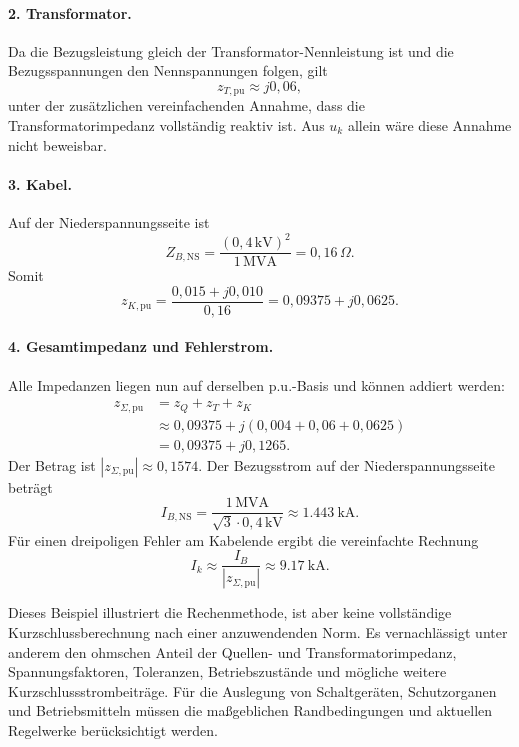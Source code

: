 \paragraph{2. Transformator.}
Da die Bezugsleistung gleich der Transformator-Nennleistung ist und die
Bezugsspannungen den Nennspannungen folgen, gilt
\[
 z_{T,\mathrm{pu}}\approx j0{,}06,
\]
unter der zusätzlichen vereinfachenden Annahme, dass die Transformatorimpedanz
vollständig reaktiv ist. Aus $u_k$ allein wäre diese Annahme nicht beweisbar.

\paragraph{3. Kabel.}
Auf der Niederspannungsseite ist
\[
 Z_{B,\mathrm{NS}}=\frac{(0{,}4\,\mathrm{kV})^2}{1\,\mathrm{MVA}}
 =0{,}16\,\Omega.
\]
Somit
\[
 z_{K,\mathrm{pu}}=\frac{0{,}015+j0{,}010}{0{,}16}
 =0{,}09375+j0{,}0625.
\]

\paragraph{4. Gesamtimpedanz und Fehlerstrom.}
Alle Impedanzen liegen nun auf derselben p.u.-Basis und können addiert werden:
\begin{align*}
 z_{\Sigma,\mathrm{pu}}&=z_Q+z_T+z_K\\
 &\approx0{,}09375+j(0{,}004+0{,}06+0{,}0625)\\
 &=0{,}09375+j0{,}1265.
\end{align*}
Der Betrag ist $|z_{\Sigma,\mathrm{pu}}|\approx0{,}1574$. Der Bezugsstrom auf
der Niederspannungsseite beträgt
\[
 I_{B,\mathrm{NS}}=\frac{1\,\mathrm{MVA}}{\sqrt{3}\cdot0{,}4\,\mathrm{kV}}
 \approx\SI{1.443}{\kilo\ampere}.
\]
Für einen dreipoligen Fehler am Kabelende ergibt die vereinfachte Rechnung
\[
 I_k\approx\frac{I_B}{|z_{\Sigma,\mathrm{pu}}|}
 \approx\SI{9.17}{\kilo\ampere}.
\]

\begin{sicherheitshinweis}
Dieses Beispiel illustriert die Rechenmethode, ist aber keine vollständige
Kurzschlussberechnung nach einer anzuwendenden Norm. Es vernachlässigt unter
anderem den ohmschen Anteil der Quellen- und Transformatorimpedanz,
Spannungsfaktoren, Toleranzen, Betriebszustände und mögliche weitere
Kurzschlussstrombeiträge. Für die Auslegung von Schaltgeräten, Schutzorganen
und Betriebsmitteln müssen die maßgeblichen Randbedingungen und aktuellen
Regelwerke berücksichtigt werden.
\end{sicherheitshinweis}

